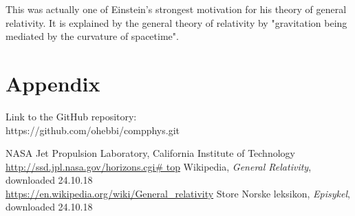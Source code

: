 \documentclass{article}
\begin{document}
This was actually one of Einstein's strongest motivation for his theory of general relativity.
It is explained by the general theory of relativity by "gravitation being mediated by the curvature of spacetime".

\section{Appendix}
Link to the GitHub repository:\\

https://github.com/ohebbi/compphys.git

\begin{thebibliography}{}
NASA Jet Propulsion Laboratory, California Institute of Technology\\
\url{http://ssd.jpl.nasa.gov/horizons.cgi# top}
Wikipedia, \textit{General Relativity}, downloaded 24.10.18\\
\url{https://en.wikipedia.org/wiki/General_relativity}
Store Norske leksikon, \textit{Episykel}, downloaded 24.10.18\\
\end{thebibliography}
\end{document}
